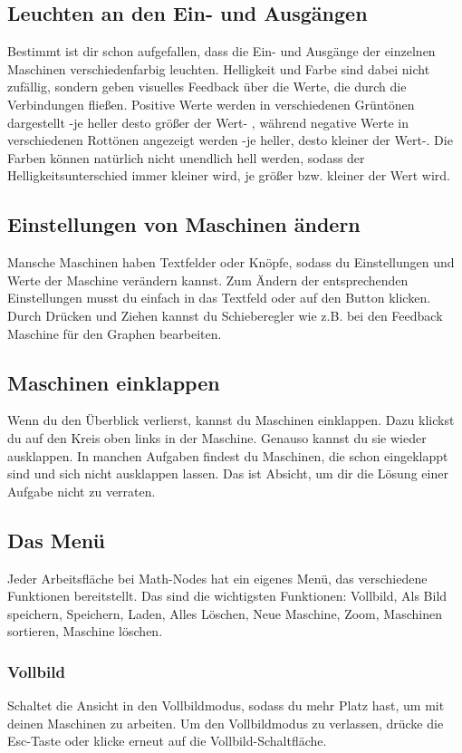 \documentclass[12pt]{report}
\begin{document}
\subsection{Leuchten an den Ein- und Ausgängen}
Bestimmt ist dir schon aufgefallen, dass die Ein- und Ausgänge der einzelnen Maschinen verschiedenfarbig leuchten. Helligkeit und Farbe sind dabei nicht zufällig, sondern geben visuelles Feedback über die Werte, die durch die Verbindungen fließen. Positive Werte werden in verschiedenen Grüntönen dargestellt -je heller desto größer der Wert- , während negative Werte in verschiedenen Rottönen angezeigt werden -je heller, desto kleiner der Wert-. Die Farben können natürlich nicht unendlich hell werden, sodass der Helligkeitsunterschied immer kleiner wird, je größer bzw. kleiner der Wert wird.
\subsection{Einstellungen von Maschinen ändern}
Mansche Maschinen haben Textfelder oder Knöpfe, sodass du Einstellungen und Werte der Maschine verändern kannst. Zum Ändern der entsprechenden Einstellungen musst du einfach in das Textfeld oder auf den Button klicken. Durch Drücken und Ziehen kannst du Schieberegler wie z.B. bei den Feedback Maschine für den Graphen bearbeiten. 
\subsection{Maschinen einklappen}
Wenn du den Überblick verlierst, kannst du Maschinen einklappen. Dazu klickst du auf den Kreis oben links in der Maschine. Genauso kannst du sie wieder ausklappen. In manchen Aufgaben findest du Maschinen, die schon eingeklappt sind und sich nicht ausklappen lassen. Das ist Absicht, um dir die Lösung einer Aufgabe nicht zu verraten.

\subsection{Das Menü}
Jeder Arbeitsfläche bei Math-Nodes hat ein eigenes Menü, das verschiedene Funktionen bereitstellt. Das sind die wichtigsten Funktionen: Vollbild, Als Bild speichern, Speichern, Laden, Alles Löschen, Neue Maschine, Zoom, Maschinen sortieren, Maschine löschen.
\subsubsection{Vollbild}
Schaltet die Ansicht in den Vollbildmodus, sodass du mehr Platz hast, um mit deinen Maschinen zu arbeiten. Um den Vollbildmodus zu verlassen, drücke die Esc-Taste oder klicke erneut auf die Vollbild-Schaltfläche.
\end{document}
